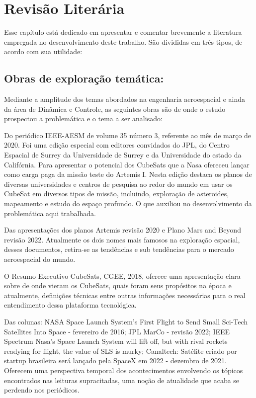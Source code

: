 \chapter{Revisão Literária}

Esse capítulo está dedicado em apresentar e comentar brevemente a literatura empregada no desenvolvimento deste trabalho. São divididas em três tipos, de acordo com sua utilidade:

\section{Obras de exploração temática:}

Mediante a amplitude dos temas abordados na engenharia aeroespacial e ainda da área de Dinâmica e Controle, as seguintes obras são de onde o estudo prospectou a problemática e o tema a ser analisado:

Do periódico IEEE-AESM de volume 35 número 3, referente ao mês de março de 2020. Foi uma edição especial com editores convidados do JPL, do Centro Espacial de Surrey da Universidade de Surrey e da Universidade do estado da Califórnia. Para apresentar o potencial dos CubeSats que a Nasa ofereceu lançar  como carga paga da missão teste do Artemis I. Nesta edição destaca os planos de diversas universidades e centros de pesquisa ao redor do mundo em usar os CubeSat em diversos tipos de missão, incluindo, exploração de asteroides, mapeamento e estudo do espaço profundo. O que auxiliou no desenvolvimento da problemática aqui trabalhada.

Das apresentações dos planos Artemis revisão 2020 e Plano Mars and Beyond revisão 2022. Atualmente os dois nomes mais famosos na exploração espacial, desses documentos, retira-se as tendências e sub tendências para o mercado aeroespacial do mundo.

 O Resumo Executivo CubeSats, CGEE, 2018, oferece uma apresentação clara sobre de onde vieram os CubeSats, quais foram seus propósitos na época e atualmente, definições técnicas entre outras informações necessárias para o real entendimento dessa plataforma tecnológica.
 
Das colunas: NASA Space Launch System’s First Flight to Send Small Sci-Tech Satellites Into Space - fevereiro de 2016; JPL  MarCo - revisão 2022; IEEE Spectrum Nasa’s Space Launch System will lift off, but with rival rockets readying for flight, the value of SLS is murky; Canaltech: Satélite criado por startup brasileira será lançado pela SpaceX em 2022 - dezembro de 2021. Oferecem uma perspectiva temporal dos acontecimentos envolvendo os tópicos encontrados nas leituras supracitadas, uma noção de atualidade que acaba se perdendo nos periódicos.

